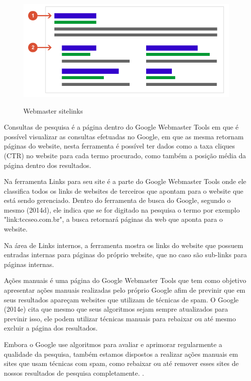 \documentclass[
	12pt,				%
	openright,			%
	twoside,			%
	a4paper,			%
	english,			%
	french,				%
	spanish,			%
	brazil				%
	]{abntex2}
\begin{document}
\begin{figure}[hbtp]
\caption{Webmaster sitelinks}
\centering
\includegraphics[totalheight=0.3\textheight]{img/webmaster-sitelinks.png}
\label{who}
\end{figure}

Consultas de pesquisa é a página dentro do Google Webmaster Tools em que é possível visualizar as consultas efetuadas no Google, em que as mesma retornam páginas do website, nesta ferramenta é possível ter dados como a taxa cliques (CTR) no website para cada termo procurado, como também a posição média da página dentro dos resultados.

Na ferramenta Links para seu site é a parte do Google Webmaster Tools onde ele classifica todos os links de websites de terceiros que apontam para o website que está sendo gerenciado. Dentro do ferramenta de busca do Google, segundo o mesmo (2014d), ele indica que se for digitado na pesquisa o termo por exemplo "link:tccseo.com.br", a busca retornará páginas da web que aponta para o website.

Na área de Links internos, a ferramenta mostra os links do website que possuem entradas internas para páginas do próprio website, que no caso são sub-links para páginas internas.

Ações manuais é uma página do Google Webmaster Tools que tem como objetivo apresentar ações manuais realizadas pelo próprio Google afim de previnir que em seus resultados apareçam websites que utilizam de técnicas de spam. O Google (2014e) cita que mesmo que seus algoritmos sejam sempre atualizados para previnir isso, ele podem utilizar técnicas manuais para rebaixar ou até mesmo excluir a página dos resultados.

\begin{citacao}
Embora o Google use algoritmos para avaliar e aprimorar regularmente a qualidade da pesquisa, também estamos dispostos a realizar ações manuais em sites que usam técnicas com spam, como rebaixar ou até remover esses sites de nossos resultados de pesquisa completamente.
\cite[p7]{NBR10520:2002}.
\end{citacao}
\end{document}
